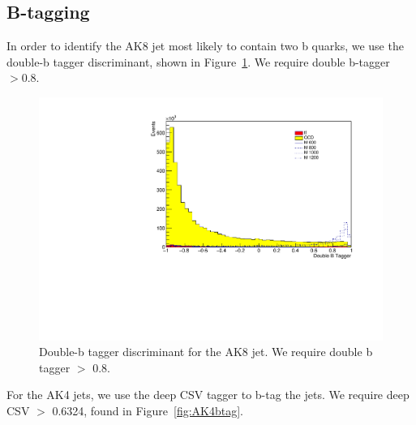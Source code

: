 
\subsection{B-tagging}

In order to identify the AK8 jet most likely to contain two b quarks, we use the double-b tagger discriminant, shown in Figure~\ref{fig:doubleb}. We require double b-tagger $> 0.8$.

\begin{figure}[h]
\begin{center}
\includegraphics[scale=0.5]{F5/shapedoubleb.pdf}
\end{center}
\caption{Double-b tagger discriminant for the AK8 jet. We require double b tagger $>$ 0.8.}
\label{fig:doubleb}
\end{figure} 

For the AK4 jets, we use the deep CSV tagger to b-tag the jets. We require deep CSV $>$ 0.6324, found in Figure~\ref{fig:AK4btag}. 

